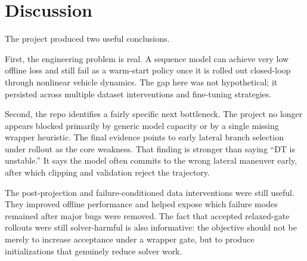 \section{Discussion}

The project produced two useful conclusions.

First, the engineering problem is real. A sequence model can achieve very low offline loss and still fail as a warm-start policy once it is rolled out closed-loop through nonlinear vehicle dynamics. The gap here was not hypothetical; it persisted across multiple dataset interventions and fine-tuning strategies.

Second, the repo identifies a fairly specific next bottleneck. The project no longer appears blocked primarily by generic model capacity or by a single missing wrapper heuristic. The final evidence points to early lateral branch selection under rollout as the core weakness. That finding is stronger than saying ``DT is unstable.'' It says the model often commits to the wrong lateral maneuver early, after which clipping and validation reject the trajectory.

The post-projection and failure-conditioned data interventions were still useful. They improved offline performance and helped expose which failure modes remained after major bugs were removed. The fact that accepted relaxed-gate rollouts were still solver-harmful is also informative: the objective should not be merely to increase acceptance under a wrapper gate, but to produce initializations that genuinely reduce solver work.

